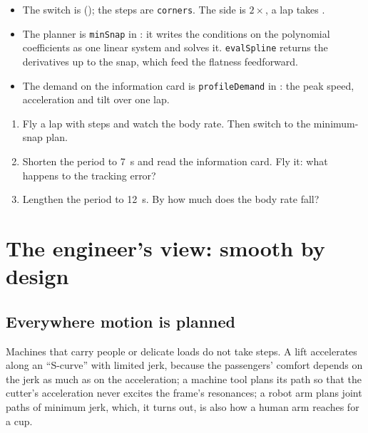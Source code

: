 \begin{inapp}
\begin{itemize}[leftmargin=1.2em]
  \item The switch is  (); the steps are \texttt{corners}. The side is $2\times$, a lap takes .
  \item The planner is \texttt{minSnap} in : it writes the conditions on the polynomial coefficients as one linear system and solves it. \texttt{evalSpline} returns the derivatives up to the snap, which feed the flatness feedforward.
  \item The demand on the information card is \texttt{profileDemand} in : the peak speed, acceleration and tilt over one lap.
\end{itemize}
\end{inapp}

\begin{trythis}
\begin{enumerate}
  \item Fly a lap with steps and watch the body rate. Then switch to the minimum-snap plan.
  \item Shorten the period to \SI{7}{s} and read the information card. Fly it: what happens to the tracking error?
  \item Lengthen the period to \SI{12}{s}. By how much does the body rate fall?
\end{enumerate}
\end{trythis}

\section{The engineer's view: smooth by design}

\subsection{Everywhere motion is planned}
Machines that carry people or delicate loads do not take steps. A lift accelerates along an \enquote{S-curve} with limited jerk, because the passengers' comfort depends on the jerk as much as on the acceleration; a machine tool plans its path so that the cutter's acceleration never excites the frame's resonances; a robot arm plans joint paths of minimum jerk, which, it turns out, is also how a human arm reaches for a cup.


